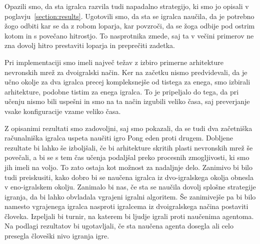 \documentclass[cover]{thesis}
\begin{document}
Opazili smo, da sta igralca razvila tudi napadalno strategijo, ki smo jo opisali v poglavju~\ref{section:results}. Ugotovili smo, da sta se igralca naučila, da je potrebno žogo odbiti kar se da z robom loparja, kar povzroči, da se žoga odbije pod ostrim kotom in s povečano hitrostjo. To nasprotnika zmede, saj ta v večini primerov ne zna dovolj hitro prestaviti loparja in preprečiti zadetka.

Pri implementaciji smo imeli največ težav z izbiro primerne arhitekture nevronskih mrež za dvoigralski način. Ker na začetku nismo predvidevali, da je učno okolje za dva igralca precej kompleksnejše od tistega za enega, smo izbirali arhitekture, podobne tistim za enega igralca. To je pripeljalo do tega, da pri učenju nismo bili uspešni in smo na ta način izgubili veliko časa, saj preverjanje vsake konfiguracije vzame veliko časa.

Z opisanimi rezultati smo zadovoljni, saj smo pokazali, da se tudi dva začetniška računalniška igralca uspeta naučiti igro Pong eden proti drugem. Dobljene rezultate bi lahko še izboljšali, če bi arhitekture skritih plasti nevronskih mrež še povečali, a bi se s tem čas učenja podaljšal preko procesnih zmogljivosti, ki smo jih imeli na voljo. To zato ostaja kot možnost za nadaljnje delo. Zanimivo bi bilo tudi preiskusiti, kako dobro bi se naučena igralca iz dvo-igralskega okolja obnesla v eno-igralskem okolju. Zanimalo bi nas, če sta se naučila dovolj splošne strategije igranja, da bi lahko obvladala vgrajeni igralni algoritem. Še zanimivejše pa bi bilo namesto vgrajenega igralca nasproti igralcema iz dvoigralskega načina postaviti človeka. Izpeljali bi turnir, na katerem bi ljudje igrali proti naučenima agentoma. Na podlagi rezultatov bi ugotavljali, če sta naučena agenta dosegla ali celo presegla človeški nivo igranja igre.
\end{document}
